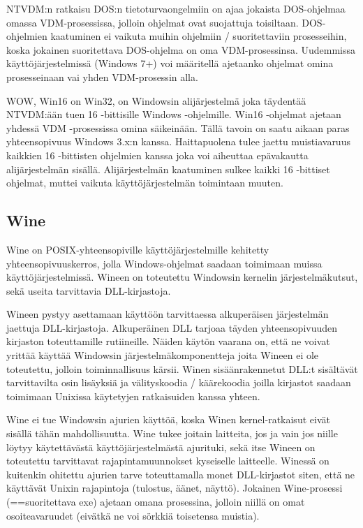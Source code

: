 NTVDM:n ratkaisu DOS:n tietoturvaongelmiin on ajaa jokaista DOS-ohjelmaa omassa VDM-prosessissa, jolloin ohjelmat ovat suojattuja toisiltaan. DOS-ohjelmien kaatuminen ei vaikuta muihin ohjelmiin / suoritettaviin prosesseihin, koska jokainen suoritettava DOS-ohjelma on oma VDM-prosessinsa. Uudemmissa käyttöjärjestelmissä (Windows 7+) voi määritellä ajetaanko ohjelmat omina prosesseinaan vai yhden VDM-prosessin alla.


WOW, Win16 on Win32, on Windowsin alijärjestelmä joka täydentää NTVDM:ään tuen 16 -bittisille Windows -ohjelmille. Win16 -ohjelmat ajetaan yhdessä VDM -prosessissa omina säikeinään. Tällä tavoin on saatu aikaan paras yhteensopivuus Windows 3.x:n kanssa. Haittapuolena tulee jaettu muistiavaruus kaikkien 16 -bittisten ohjelmien kanssa joka voi aiheuttaa epävakautta alijärjestelmän sisällä. Alijärjestelmän kaatuminen sulkee kaikki 16 -bittiset ohjelmat, muttei vaikuta käyttöjärjestelmän toimintaan muuten.



\subsection{Wine}
Wine on POSIX-yhteensopiville käyttöjärjestelmille kehitetty yhteensopivuuskerros, jolla Windows-ohjelmat saadaan toimimaan muissa käyttöjärjestelmissä. Wineen on toteutettu Windowsin kernelin järjestelmäkutsut, sekä useita tarvittavia DLL-kirjastoja.

Wineen pystyy asettamaan käyttöön tarvittaessa alkuperäisen järjestelmän jaettuja DLL-kirjastoja. Alkuperäinen DLL tarjoaa täyden yhteensopivuuden kirjaston toteuttamille rutiineille. Näiden käytön vaarana on, että ne voivat yrittää käyttää Windowsin järjestelmäkomponentteja joita Wineen ei ole toteutettu, jolloin toiminnallisuus kärsii. Winen sisäänrakennetut DLL:t sisältävät tarvittavilta osin lisäyksiä ja välityskoodia / käärekoodia joilla kirjastot saadaan toimimaan Unixissa käytetyjen ratkaisuiden kanssa yhteen.

Wine ei tue Windowsin ajurien käyttöä, koska Winen kernel-ratkaisut eivät sisällä tähän mahdollisuutta. Wine tukee joitain laitteita, jos ja vain jos niille löytyy käytettävästä käyttöjärjestelmästä ajurituki, sekä itse Wineen on toteutettu tarvittavat rajapintamuunnokset kyseiselle laitteelle. Winessä on kuitenkin ohitettu ajurien tarve toteuttamalla monet DLL-kirjastot siten, että ne käyttävät Unixin rajapintoja (tulostus, äänet, näyttö). Jokainen Wine-prosessi (==suoritettava exe) ajetaan omana prosessina, jolloin niillä on omat osoiteavaruudet (eivätkä ne voi sörkkiä toisetensa muistia).

